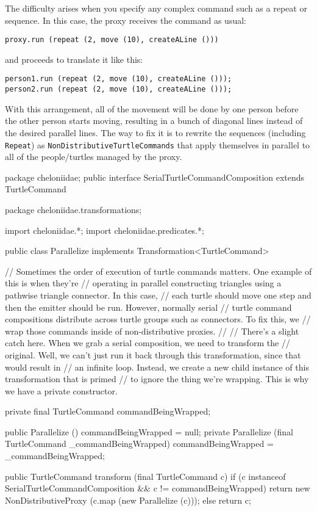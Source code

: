 \documentclass{report}
\begin{document}
      The difficulty arises when you specify any complex command such as a repeat or sequence. In this case, the proxy receives the command as usual:

\begin{verbatim}
proxy.run (repeat (2, move (10), createALine ()))
\end{verbatim}

      \noindent and proceeds to translate it like this:

\begin{verbatim}
person1.run (repeat (2, move (10), createALine ()));
person2.run (repeat (2, move (10), createALine ()));
\end{verbatim}

      \noindent With this arrangement, all of the movement will be done by one person before the other person starts moving, resulting in a bunch of diagonal
      lines instead of the desired parallel lines. The way to fix it is to rewrite the sequences (including {\tt Repeat}) as {\tt NonDistributiveTurtleCommands}
      that apply themselves in parallel to all of the people/turtles managed by the proxy.

\begin{javacode}
package cheloniidae;
public interface SerialTurtleCommandComposition extends TurtleCommand {}
\end{javacode}

\begin{javacode}
package cheloniidae.transformations;

import cheloniidae.*;
import cheloniidae.predicates.*;

public class Parallelize implements Transformation<TurtleCommand> {
  // Sometimes the order of execution of turtle commands matters. One example of this is when they're
  // operating in parallel constructing triangles using a pathwise triangle connector. In this case,
  // each turtle should move one step and then the emitter should be run. However, normally serial
  // turtle command compositions distribute across turtle groups such as connectors. To fix this, we
  // wrap those commands inside of non-distributive proxies.
  //
  // There's a slight catch here. When we grab a serial composition, we need to transform the
  // original. Well, we can't just run it back through this transformation, since that would result in
  // an infinite loop. Instead, we create a new child instance of this transformation that is primed
  // to ignore the thing we're wrapping. This is why we have a private constructor.

  private final TurtleCommand commandBeingWrapped;

  public  Parallelize ()                                         {commandBeingWrapped = null;}
  private Parallelize (final TurtleCommand _commandBeingWrapped) {commandBeingWrapped = _commandBeingWrapped;}

  public TurtleCommand transform (final TurtleCommand c) {
    if (c instanceof SerialTurtleCommandComposition && c != commandBeingWrapped)
      return new NonDistributiveProxy (c.map (new Parallelize (c)));
    else return c;
  }
}
\end{javacode}
\end{document}
